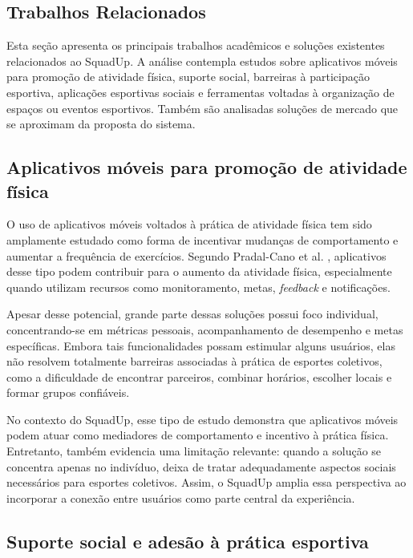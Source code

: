 \documentclass[a4paper, 12pt]{article}
\begin{document}
\begin{justify}
\clearpage

\section{Trabalhos Relacionados}

Esta seção apresenta os principais trabalhos acadêmicos e soluções existentes relacionados ao SquadUp. A análise contempla estudos sobre aplicativos móveis para promoção de atividade física, suporte social, barreiras à participação esportiva, aplicações esportivas sociais e ferramentas voltadas à organização de espaços ou eventos esportivos. Também são analisadas soluções de mercado que se aproximam da proposta do sistema.

\subsection{Aplicativos móveis para promoção de atividade física}

O uso de aplicativos móveis voltados à prática de atividade física tem sido amplamente estudado como forma de incentivar mudanças de comportamento e aumentar a frequência de exercícios. Segundo Pradal-Cano et al. \citep{pradal-cano_using_2020}, aplicativos desse tipo podem contribuir para o aumento da atividade física, especialmente quando utilizam recursos como monitoramento, metas, \textit{feedback} e notificações.

Apesar desse potencial, grande parte dessas soluções possui foco individual, concen\-trando-se em métricas pessoais, acompanhamento de desempenho e metas específicas. Embora tais funcionalidades possam estimular alguns usuários, elas não resolvem totalmente barreiras associadas à prática de esportes coletivos, como a dificuldade de encontrar parceiros, combinar horários, escolher locais e formar grupos confiáveis.

No contexto do SquadUp, esse tipo de estudo demonstra que aplicativos móveis podem atuar como mediadores de comportamento e incentivo à prática física. Entretanto, também evidencia uma limitação relevante: quando a solução se concentra apenas no indivíduo, deixa de tratar adequadamente aspectos sociais necessários para esportes coletivos. Assim, o SquadUp amplia essa perspectiva ao incorporar a conexão entre usuários como parte central da experiência.

\subsection{Suporte social e adesão à prática esportiva}


\end{justify}
\end{document}
